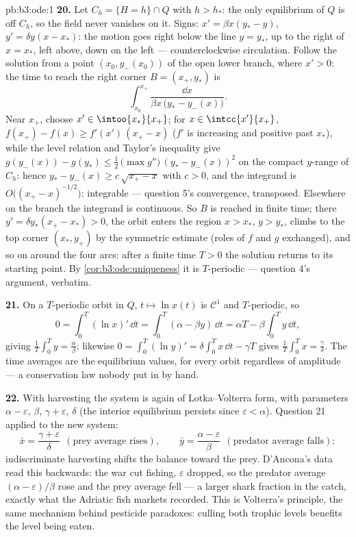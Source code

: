 \begin{solution}{pb:b3:ode:1}
\textbf{20.} Let $C_h = \{H = h\}\cap Q$ with $h > h_*$: the
only equilibrium of $Q$ is off $C_h$, so the field never
vanishes on it. Signs: $x' = \beta x(y_* - y)$, $y' =
\delta y(x - x_*)$: the motion goes right below the line $y
= y_*$, up to the right of $x = x_*$, left above, down on
the left --- counterclockwise circulation. Follow the
solution from a point $(x_0, y_-(x_0))$ of the open lower
branch, where $x' > 0$: the time to reach the right corner
$B = (x_+, y_*)$ is
\[
\int_{x_0}^{x_+}\frac{\dd x}{\beta x\,\bigl(y_* -
y_-(x)\bigr)} .
\]
Near $x_+$, choose $x' \in \intoo{x_*}{x_+}$; for $x \in
\intcc{x'}{x_+}$, $f(x_+) - f(x) \geq f'(x')\,(x_+ - x)$
($f'$ is increasing and positive past $x_*$), while the
level relation and Taylor's inequality give $g(y_-(x)) -
g(y_*) \leq \frac12\,\bigl(\max g''\bigr)\,(y_* -
y_-(x))^2$ on the compact $y$-range of $C_h$: hence $y_* -
y_-(x) \geq c\,\sqrt{x_+ - x}$ with $c > 0$, and the
integrand is $O\bigl((x_+ - x)^{-1/2}\bigr)$: integrable ---
question 5's convergence, transposed. Elsewhere on the
branch the integrand is continuous. So $B$ is reached in
finite time; there $y' = \delta y_*(x_+ - x_*) > 0$, the
orbit enters the region $x > x_*$, $y > y_*$, climbs to the
top corner $(x_*, y_+)$ by the symmetric estimate (roles of
$f$ and $g$ exchanged), and so on around the four arcs:
after a finite time $T > 0$ the solution returns to its
starting point. By \cref{cor:b3:ode:uniqueness} it is
$T$-periodic --- question 4's argument, verbatim.

\textbf{21.} On a $T$-periodic orbit in $Q$, $t \mapsto \ln
x(t)$ is $\mathcal C^1$ and $T$-periodic, so
\[
0 = \int_0^T(\ln x)'\,\dd t
= \int_0^T(\alpha - \beta y)\,\dd t
= \alpha T - \beta\int_0^Ty\,\dd t ,
\]
giving $\frac1T\int_0^Ty = \frac\alpha\beta$; likewise $0 =
\int_0^T(\ln y)' = \delta\int_0^Tx\,\dd t - \gamma T$ gives
$\frac1T\int_0^Tx = \frac\gamma\delta$. The time averages
are the equilibrium values, for every orbit regardless of
amplitude --- a conservation law nobody put in by hand.

\textbf{22.} With harvesting the system is again of
Lotka--Volterra form, with parameters $\alpha -
\varepsilon$, $\beta$, $\gamma + \varepsilon$, $\delta$ (the
interior equilibrium persists since $\varepsilon <
\alpha$). Question 21 applied to the new system:
\[
\bar x = \frac{\gamma + \varepsilon}{\delta}
\ \ (\text{prey average rises}),
\qquad
\bar y = \frac{\alpha - \varepsilon}{\beta}
\ \ (\text{predator average falls}) :
\]
indiscriminate harvesting shifts the balance toward the
prey. D'Ancona's data read this backwards: the war cut
fishing, $\varepsilon$ dropped, so the predator average
$(\alpha - \varepsilon)/\beta$ rose and the prey average
fell --- a larger shark fraction in the catch, exactly what
the Adriatic fish markets recorded. This is Volterra's
principle, the same mechanism behind pesticide paradoxes:
culling both trophic levels benefits the level being eaten.


\end{solution}
